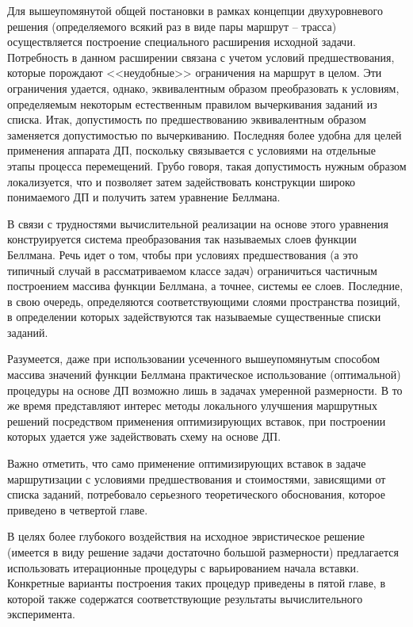 \documentclass[11pt,twoside,openany]{report}
\begin{document}
Для вышеупомянутой общей постановки
в рамках концепции двухуровневого решения
(определяемого всякий раз в виде пары маршрут -- трасса)
осуществляется построение специального расширения исходной задачи.
Потребность в данном расширении связана с учетом условий предшествования,
которые порождают <<неудобные>> ограничения на маршрут в целом.
Эти ограничения удается, однако,
эквивалентным образом преобразовать к условиям,
определяемым некоторым естественным правилом вычеркивания заданий из списка.
Итак, допустимость по предшествованию эквивалентным образом
заменяется допустимостью по вычеркиванию.
Последняя более удобна для целей применения аппарата ДП,
поскольку связывается с условиями на отдельные этапы процесса перемещений.
Грубо говоря,
такая допустимость нужным образом локализуется,
что и позволяет затем задействовать конструкции
широко понимаемого ДП и получить затем уравнение Беллмана.

В связи с трудностями вычислительной реализации
на основе этого уравнения конструируется
система преобразования так называемых слоев функции Беллмана.
Речь идет о том, чтобы при условиях предшествования
(а это типичный случай в рассматриваемом классе задач)
ограничиться частичным построением массива функции Беллмана,
а точнее, системы ее слоев.
Последние, в свою очередь, определяются
соответствующими слоями пространства позиций,
в определении которых задействуются
так называемые существенные списки заданий.

Разумеется, даже при использовании усеченного
вышеупомянутым способом массива значений
функции Беллмана практическое использование
(оптимальной) процедуры на основе ДП возможно лишь
в задачах умеренной размерности.
В то же время представляют интерес методы
локального улучшения маршрутных решений
посредством применения оптимизирующих вставок,
при построении которых удается уже задействовать схему на основе ДП.

Важно отметить, что само применение оптимизирующих вставок
в задаче маршрутизации с условиями предшествования и стоимостями,
зависящими от списка заданий,
потребовало серьезного теоретического обоснования,
которое приведено в четвертой главе.

В целях более глубокого воздействия на
исходное эвристическое решение
(имеется в виду решение задачи достаточно большой размерности)
предлагается использовать итерационные процедуры с варьированием начала вставки.
Конкретные варианты построения таких процедур
приведены в пятой главе,
в которой также содержатся соответствующие результаты
вычислительного эксперимента.
\end{document}
